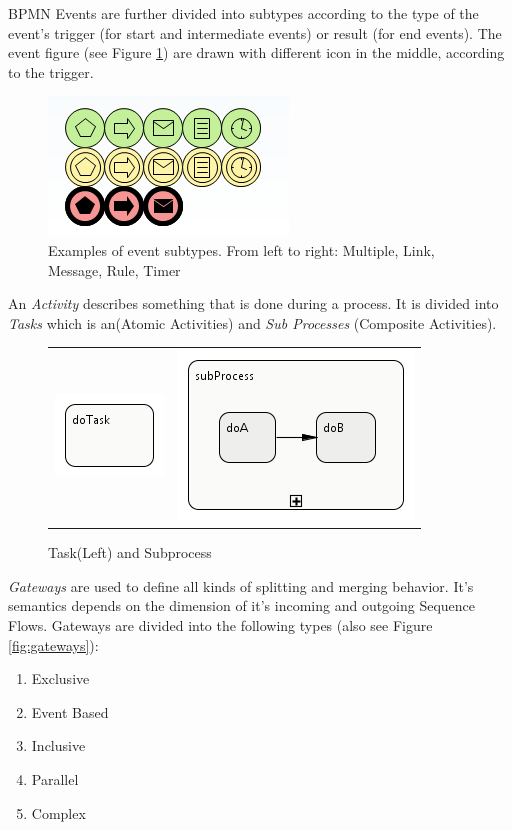 BPMN Events are further divided into subtypes according to the type of the event's trigger (for start and intermediate events) or result (for end events). The event figure (see Figure \ref{fig:event_subtypes}) are drawn with different icon in the middle, according to the trigger.
\begin{figure}[htbp]
	\centering
	\includegraphics{images/event_types.png}
	\caption{Examples of event subtypes. From left to right: Multiple, Link, Message, Rule, Timer}
	\label{fig:event_subtypes}
\end{figure}

 
An \textit{Activity} describes something that is done during a process. It is divided into \textit{Tasks} which is an(Atomic Activities) and \textit{Sub Processes} (Composite Activities).\\
\begin{figure}[h]
\centering
\begin{tabular}{cc}
\includegraphics{images/mapping/task.png} & \includegraphics{images/mapping/subprocess.png}
\end{tabular}
\caption{Task(Left) and Subprocess}%
\label{fig:task+subprocess}%
\end{figure}

\textit{Gateways} are used to define all kinds of splitting and merging behavior. It's semantics depends on the dimension of it's incoming and outgoing Sequence Flows. Gateways are divided into the following types (also see Figure \ref{fig:gateways}):\\
\begin{enumerate}
	\item Exclusive
	\item Event Based
	\item Inclusive
	\item Parallel
	\item Complex
\end{enumerate}

